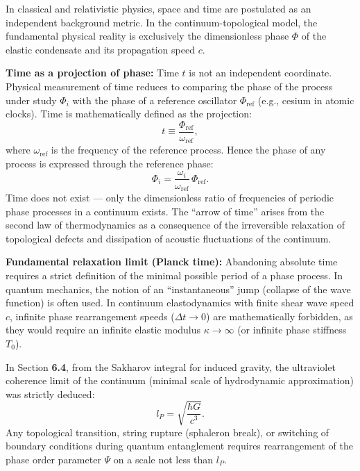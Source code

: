 \documentclass[11pt,a4paper]{article}
\begin{document}
In classical and relativistic physics, space and time are postulated as an independent background metric. In the continuum-topological model, the fundamental physical reality is exclusively the dimensionless phase $\Phi$ of the elastic condensate and its propagation speed $c$.

\textbf{Time as a projection of phase:}
Time $t$ is not an independent coordinate. Physical measurement of time reduces to comparing the phase of the process under study $\Phi_i$ with the phase of a reference oscillator $\Phi_{\text{ref}}$ (e.g., cesium in atomic clocks). Time is mathematically defined as the projection:
\begin{equation}
t \equiv \frac{\Phi_{\text{ref}}}{\omega_{\text{ref}}},
\end{equation}
where $\omega_{\text{ref}}$ is the frequency of the reference process. Hence the phase of any process is expressed through the reference phase:
\begin{equation}
\Phi_i = \frac{\omega_i}{\omega_{\text{ref}}}\, \Phi_{\text{ref}}.
\end{equation}
Time does not exist — only the dimensionless ratio of frequencies of periodic phase processes in a continuum exists. The ``arrow of time'' arises from the second law of thermodynamics as a consequence of the irreversible relaxation of topological defects and dissipation of acoustic fluctuations of the continuum.

\textbf{Fundamental relaxation limit (Planck time):}
Abandoning absolute time requires a strict definition of the minimal possible period of a phase process. In quantum mechanics, the notion of an ``instantaneous'' jump (collapse of the wave function) is often used. In continuum elastodynamics with finite shear wave speed $c$, infinite phase rearrangement speeds ($\Delta t \to 0$) are mathematically forbidden, as they would require an infinite elastic modulus $\kappa \to \infty$ (or infinite phase stiffness $T_0$).

In Section \textbf{6.4}, from the Sakharov integral for induced gravity, the ultraviolet coherence limit of the continuum (minimal scale of hydrodynamic approximation) was strictly deduced:
\begin{equation}
l_P = \sqrt{\frac{\hbar G}{c^3}}.
\end{equation}
Any topological transition, string rupture (sphaleron break), or switching of boundary conditions during quantum entanglement requires rearrangement of the phase order parameter $\Psi$ on a scale not less than $l_P$.
\end{document}
